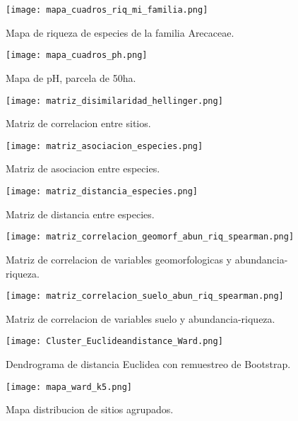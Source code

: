 \documentclass[11pt,]{article}
\begin{document}
\begin{figure}
\centering
\texttt{[image: mapa\_cuadros\_riq\_mi\_familia.png]}
\caption{Mapa de riqueza de especies de la familia Arecaceae.
\label{fig:mapa_cuadros_riq_mi_familia}}
\end{figure}

\begin{figure}
\centering
\texttt{[image: mapa\_cuadros\_ph.png]}
\caption{Mapa de pH, parcela de 50ha. \label{fig:mapa_cuadros_pH}}
\end{figure}

\begin{figure}
\centering
\texttt{[image: matriz\_disimilaridad\_hellinger.png]}
\caption{Matriz de correlacion entre sitios.
\label{fig:matriz_disimilaridad_hellinger}}
\end{figure}

\begin{figure}
\centering
\texttt{[image: matriz\_asociacion\_especies.png]}
\caption{Matriz de asociacion entre especies.
\label{fig:matriz_asociacion_especies}}
\end{figure}

\begin{figure}
\centering
\texttt{[image: matriz\_distancia\_especies.png]}
\caption{Matriz de distancia entre especies.
\label{fig:matriz_distancia_especies}}
\end{figure}

\begin{figure}
\centering
\texttt{[image: matriz\_correlacion\_geomorf\_abun\_riq\_spearman.png]}
\caption{Matriz de correlacion de variables geomorfologicas y
abundancia-riqueza.
\label{fig:matriz_correlacion_geomorf_abun_riq_spearman}}
\end{figure}

\begin{figure}
\centering
\texttt{[image: matriz\_correlacion\_suelo\_abun\_riq\_spearman.png]}
\caption{Matriz de correlacion de variables suelo y abundancia-riqueza.
\label{fig:matriz_correlacion_suelo_abun_riq_spearman}}
\end{figure}

\begin{figure}
\centering
\texttt{[image: Cluster\_Euclideandistance\_Ward.png]}
\caption{Dendrograma de distancia Euclidea con remuestreo de Bootstrap.
\label{fig:Cluster_Euclideandistance_Ward}}
\end{figure}

\begin{figure}
\centering
\texttt{[image: mapa\_ward\_k5.png]}
\caption{Mapa distribucion de sitios agrupados.
\label{fig:mapa_ward_k5}}
\end{figure}
\end{document}
